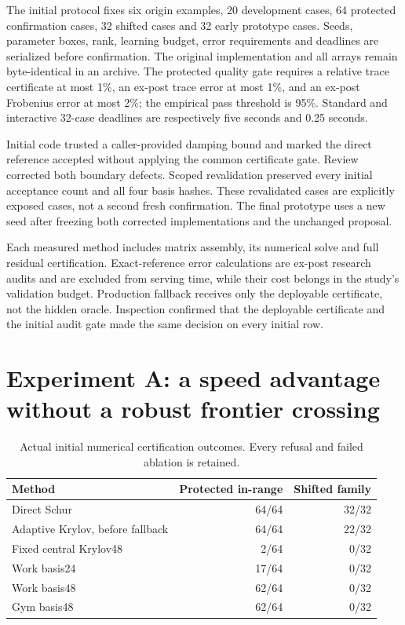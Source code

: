 \documentclass[11pt,letterpaper]{article}
\begin{document}
The initial protocol fixes six origin examples, 20 development cases, 64 protected confirmation cases, 32 shifted cases and 32 early prototype cases. Seeds, parameter boxes, rank, learning budget, error requirements and deadlines are serialized before confirmation. The original implementation and all arrays remain byte-identical in an archive. The protected quality gate requires a relative trace certificate at most 1\%, an ex-post trace error at most 1\%, and an ex-post Frobenius error at most 2\%; the empirical pass threshold is 95\%. Standard and interactive 32-case deadlines are respectively five seconds and 0.25 seconds.

Initial code trusted a caller-provided damping bound and marked the direct reference accepted without applying the common certificate gate. Review corrected both boundary defects. Scoped revalidation preserved every initial acceptance count and all four basis hashes. These revalidated cases are explicitly exposed cases, not a second fresh confirmation. The final prototype uses a new seed after freezing both corrected implementations and the unchanged proposal.

Each measured method includes matrix assembly, its numerical solve and full residual certification. Exact-reference error calculations are ex-post research audits and are excluded from serving time, while their cost belongs in the study's validation budget. Production fallback receives only the deployable certificate, not the hidden oracle. Inspection confirmed that the deployable certificate and the initial audit gate made the same decision on every initial row.

\section{Experiment A: a speed advantage without a robust frontier crossing}

\begin{table}[htbp]\centering
\begin{tabular}{lrr}\toprule
Method & Protected in-range & Shifted family\\\midrule
Direct Schur &64/64&32/32\\
Adaptive Krylov, before fallback &64/64&22/32\\
Fixed central Krylov48 &2/64&0/32\\
Work basis24 &17/64&0/32\\
Work basis48 &62/64&0/32\\
Gym basis48 &62/64&0/32\\\bottomrule
\end{tabular}
\caption{Actual initial numerical certification outcomes. Every refusal and failed ablation is retained.}
\end{table}
\end{document}
